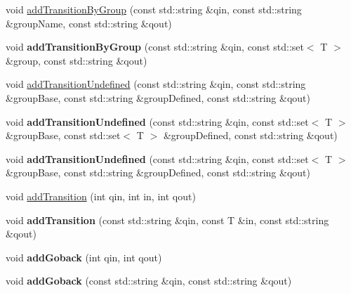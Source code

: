 \begin{DoxyCompactItemize}
\item 
void \hyperlink{classx2_1_1_determinastic_f_a_a28c9f0dc652f38e8a08d67e2d911d56d}{add\+Transition\+By\+Group} (const std\+::string \&qin, const std\+::string \&group\+Name, const std\+::string \&qout)
\item 
\mbox{\label{classx2_1_1_determinastic_f_a_ad373a317b0f3ba584f0ccfab895dff74}} 
void {\bfseries add\+Transition\+By\+Group} (const std\+::string \&qin, const std\+::set$<$ T $>$ \&group, const std\+::string \&qout)
\item 
void \hyperlink{classx2_1_1_determinastic_f_a_ab5efc90ac528b9d8383b993aa93b6ced}{add\+Transition\+Undefined} (const std\+::string \&qin, const std\+::string \&group\+Base, const std\+::string \&group\+Defined, const std\+::string \&qout)
\item 
\mbox{\label{classx2_1_1_determinastic_f_a_aabaaf1756a7628e0652dde5a31e41627}} 
void {\bfseries add\+Transition\+Undefined} (const std\+::string \&qin, const std\+::set$<$ T $>$ \&group\+Base, const std\+::set$<$ T $>$ \&group\+Defined, const std\+::string \&qout)
\item 
\mbox{\label{classx2_1_1_determinastic_f_a_a2f71e4692153903869b8200df6b8161d}} 
void {\bfseries add\+Transition\+Undefined} (const std\+::string \&qin, const std\+::set$<$ T $>$ \&group\+Base, const std\+::string \&group\+Defined, const std\+::string \&qout)
\item 
void \hyperlink{classx2_1_1_determinastic_f_a_adbd0f99ea29d31abd9f9675ee5b9fdef}{add\+Transition} (int qin, int in, int qout)
\item 
\mbox{\label{classx2_1_1_determinastic_f_a_a64c85bde0d8df31c30758cfcb1acaf2c}} 
void {\bfseries add\+Transition} (const std\+::string \&qin, const T \&in, const std\+::string \&qout)
\item 
\mbox{\label{classx2_1_1_determinastic_f_a_a2dce2abc6c295032900475c6d3a2bfcf}} 
void {\bfseries add\+Goback} (int qin, int qout)
\item 
\mbox{\label{classx2_1_1_determinastic_f_a_a63cba8c5c4df112ab140d1d8c674635b}} 
void {\bfseries add\+Goback} (const std\+::string \&qin, const std\+::string \&qout)

\end{DoxyCompactItemize}
